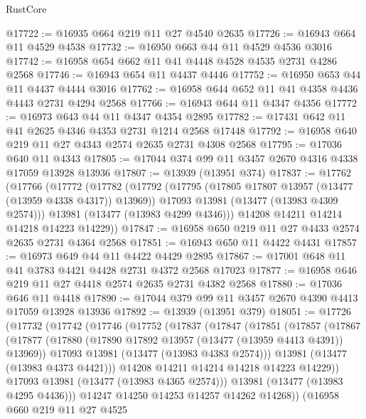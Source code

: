 \begin{lexlean}{RustCore}
\begin{coremodule}
@17722 := @16935 @664 @219 @11 @27 @4540 @2635
@17726 := @16943 @664 @11 @4529 @4538
@17732 := @16950 @663 @44 @11 @4529 @4536 @3016
@17742 := @16958 @654 @662 @11 @41 @4448 @4528 @4535 @2731 @4286 @2568
@17746 := @16943 @654 @11 @4437 @4446
@17752 := @16950 @653 @44 @11 @4437 @4444 @3016
@17762 := @16958 @644 @652 @11 @41 @4358 @4436 @4443 @2731 @4294 @2568
@17766 := @16943 @644 @11 @4347 @4356
@17772 := @16973 @643 @44 @11 @4347 @4354 @2895
@17782 := @17431 @642 @11 @41 @2625 @4346 @4353 @2731 @1214 @2568 @17448
@17792 := @16958 @640 @219 @11 @27 @4343 @2574 @2635 @2731 @4308 @2568
@17795 := @17036 @640 @11 @4343
@17805 := @17044 @374 @99 @11 @3457 @2670 @4316 @4338 @17059 @13928 @13936
@17807 := @13939 (@13951 @374)
@17837 := @17762
    (@17766
      (@17772
        (@17782
          (@17792
            (@17795 (@17805 @17807 @13957 (@13477 (@13959 @4338 @4317)) @13969))
            @17093
            @13981
            (@13477 (@13983 @4309 @2574)))
          @13981
          (@13477 (@13983 @4299 @4346)))
        @14208
        @14211
        @14214
        @14218
        @14223
        @14229))
@17847 := @16958 @650 @219 @11 @27 @4433 @2574 @2635 @2731 @4364 @2568
@17851 := @16943 @650 @11 @4422 @4431
@17857 := @16973 @649 @44 @11 @4422 @4429 @2895
@17867 := @17001 @648 @11 @41 @3783 @4421 @4428 @2731 @4372 @2568 @17023
@17877 := @16958 @646 @219 @11 @27 @4418 @2574 @2635 @2731 @4382 @2568
@17880 := @17036 @646 @11 @4418
@17890 := @17044 @379 @99 @11 @3457 @2670 @4390 @4413 @17059 @13928 @13936
@17892 := @13939 (@13951 @379)
@18051 := @17726
    (@17732
      (@17742
        (@17746
          (@17752
            (@17837
              (@17847
                (@17851
                  (@17857
                    (@17867
                      (@17877
                        (@17880 (@17890 @17892 @13957 (@13477 (@13959 @4413 @4391)) @13969))
                        @17093
                        @13981
                        (@13477 (@13983 @4383 @2574)))
                      @13981
                      (@13477 (@13983 @4373 @4421)))
                    @14208
                    @14211
                    @14214
                    @14218
                    @14223
                    @14229))
                @17093
                @13981
                (@13477 (@13983 @4365 @2574)))
              @13981
              (@13477 (@13983 @4295 @4436)))
            @14247
            @14250
            @14253
            @14257
            @14262
            @14268))
        (@16958
          @660
          @219
          @11
          @27
          @4525

\end{coremodule}
\end{lexlean}
